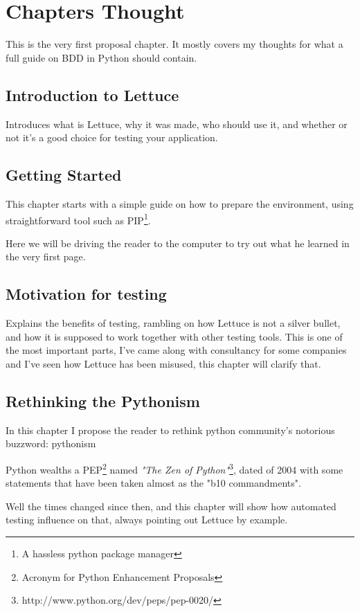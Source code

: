 \documentclass[letterpaper]{article}
\begin{document}
\section*{Chapters Thought}
This is the very first proposal chapter. It mostly covers my
thoughts for what a full guide on BDD in Python should contain.

\subsection*{Introduction to Lettuce}
\noindent
Introduces what is Lettuce, why it was made, who should use it, and
whether or not it's a good choice for testing your application.

\subsection*{Getting Started}
This chapter starts with a simple guide on how to prepare the environment, using straightforward tool such as PIP\footnote{A hassless python package manager}.

Here we will be driving the reader to the computer to try out what he
learned in the very first page.

\subsection*{Motivation for testing}
Explains the benefits of testing, rambling on how Lettuce is not a
silver bullet, and how it is supposed to work together with other
testing tools.
This is one of the most important parts, I've came along with
consultancy for some companies and I've seen how Lettuce has been
misused, this chapter will clarify that.

\subsection*{Rethinking the Pythonism}
In this chapter I propose the reader to rethink python community's
notorious buzzword: pythonism

Python wealths a PEP\footnote{Acronym for Python Enhancement Proposals} named \textit{"The Zen of Python"}\footnote{http://www.python.org/dev/peps/pep-0020/}, dated of 2004 with some statements that have been taken almost as the "b10 commandments".

Well the times changed since then, and this chapter will show how
automated testing influence on that, always pointing out Lettuce by
example.
\end{document}
